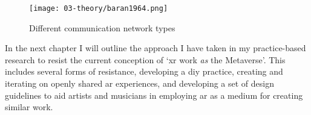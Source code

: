\begin{figure}[ht]
    \centering
    \texttt{[image: 03-theory/baran1964.png]}
    \captionsetup{justification=centering,margin=1.5cm}
    \caption{Different communication network types \citep[in][]{baran1964}}\label{fig: baran1964}
\end{figure}


In the next chapter I will outline the approach I have taken in my practice-based research to resist the current conception of `\gls{xr} work \textit{as} the Metaverse'. This includes several forms of resistance, developing a \gls{diy} practice, creating and iterating on openly shared \gls{ar} experiences, and developing a set of design guidelines to aid artists and musicians in employing \gls{ar} as a medium for creating similar work.